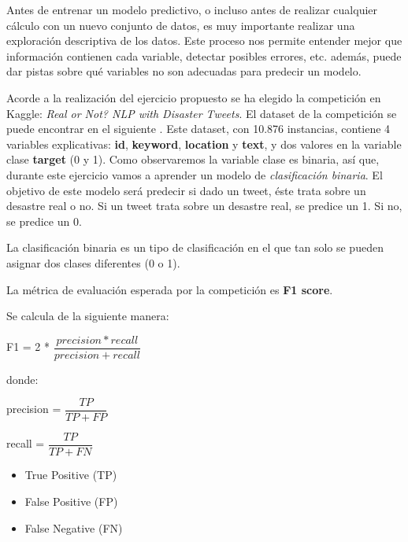 \documentclass[]{article}
\begin{document}
Antes de entrenar un modelo predictivo, o incluso antes de realizar
cualquier cálculo con un nuevo conjunto de datos, es muy importante
realizar una exploración descriptiva de los datos. Este proceso nos
permite entender mejor que información contienen cada variable, detectar
posibles errores, etc. además, puede dar pistas sobre qué variables no
son adecuadas para predecir un modelo.

Acorde a la realización del ejercicio propuesto se ha elegido la
competición en Kaggle: \emph{Real or Not? NLP with Disaster Tweets}.
El dataset de la competición se puede encontrar en el siguiente \href{https://www.kaggle.com/c/nlp-getting-started/data}{\color{blue}{enlace}}. Este dataset,
con 10.876 instancias, contiene 4 variables explicativas: \textbf{id},
\textbf{keyword}, \textbf{location} y \textbf{text}, y dos valores en la
variable clase \textbf{target} (0 y 1). Como observaremos la
variable clase es binaria, así que, durante este ejercicio vamos a
aprender un modelo de \emph{clasificación binaria}. El objetivo de este
modelo será predecir si dado un tweet, éste trata sobre un desastre real
o no. Si un tweet trata sobre un desastre real, se predice un 1. Si no,
se predice un 0.

\begin{tcolorbox}
La clasificación binaria es un tipo de clasificación en el que tan
solo se pueden asignar dos clases diferentes (0 o 1).	
\end{tcolorbox}

La métrica de evaluación esperada por la competición es \textbf{F1
score}. 

Se calcula de la siguiente manera:

\begin{center}
	F1 = 2 * $\dfrac{precision * recall}{precision + recall}$
\end{center}

donde:

\begin{center}	
	precision = $\dfrac{TP}{TP + FP}$
	
	recall = $\dfrac{TP}{TP + FN}$
\end{center}

\begin{itemize}
	\item True Positive (TP)
	\item False Positive (FP)
	\item False Negative (FN)
\end{itemize}
\end{document}
